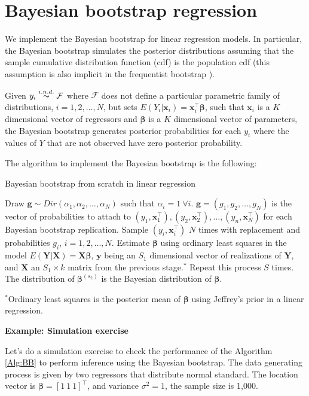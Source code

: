 \section{Bayesian bootstrap regression}\label{sec610}

We implement the Bayesian bootstrap \cite{Rubin1981} for linear regression models. In particular, the Bayesian bootstrap simulates the posterior distributions assuming that the sample cumulative distribution function (cdf) is the population cdf (this assumption is also implicit in the frequentist bootstrap \cite{Efron1979}).

Given $y_i\stackrel{i.n.d.} {\thicksim}\mathcal{F}$ where $\mathcal{F}$ does not define a particular parametric family of distributions, $i=1,2,\dots,N$, but sets $E(Y_i|\bm{x}_i)=\bm{x}_i^{\top}\bm{\beta}$, such that $\bm{x}_i$ is a $K$ dimensional vector of regressors and $\bm{\beta}$ is a $K$ dimensional vector of parameters, the Bayesian bootstrap generates posterior probabilities for each $y_i$ where the values of $Y$ that are not observed have zero posterior probability.

The algorithm to implement the Bayesian bootstrap is the following:
\begin{algorithm}[!h]
	\caption{Bayesian bootstrap from scratch in linear regression}
	\label{Alg:BB}
	\begin{algorithmic}[1]
		\State Draw $\bm{g}\sim Dir(\alpha_1,\alpha_2,\dots,\alpha_N)$ such that $\alpha_i=1 \ \forall i$.
		\State $\bm{g}=(g_1,g_2,\dots,g_N)$ is the vector of probabilities to attach to $(y_1,\bm{x}_1^{\top}),(y_2,\bm{x}_2^{\top}),\dots,(y_n,\bm{x}_N^{\top})$ for each Bayesian bootstrap replication.
		\State Sample $(y_i,\bm{x}_i^{\top})$ $N$ times with replacement and probabilities $g_i$, $i=1,2,\dots,N$.
		\State Estimate $\bm{\beta}$ using ordinary least squares in the model $E(\bm{Y}|\bm{X})=\bm{X}\bm{\beta}$, $\bm{y}$ being an $S_1$ dimensional vector of realizations of $\bm{Y}$, and $\bm{X}$ an $S_1\times k$ matrix from the previous stage.$^*$ 
		\State Repeat this process $S$ times.
		\State The distribution of $\bm{\beta}^{(s_2)}$ is the Bayesian distribution of $\bm{\beta}$.		
	\end{algorithmic}
	$^*${\footnotesize{Ordinary least squares is the posterior mean of $\bm{\beta}$ using Jeffrey's prior in a linear regression.}}
\end{algorithm}

\textbf{Example: Simulation exercise}

Let's do a simulation exercise to check the performance of the Algorithm \ref{Alg:BB} to perform inference using the Bayesian bootstrap. The data generating process is given by two regressors that distribute normal standard. The location vector is $\bm{\beta}=\left[1 \ 1 \ 1\right]^{\top}$, and variance $\sigma^2=1$, the sample size is 1,000.

